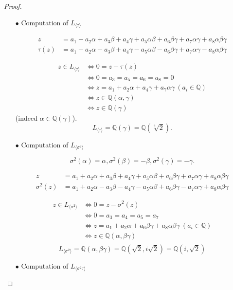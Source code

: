 \documentclass[11pt,a4paper]{article}
\newcommand{\Q}{\mathbb{Q}}
\begin{document}
\begin{proof}
\begin{enumerate}
\item[$\bullet$] Computation of $L_{\langle \tau\rangle}$

\begin{align*}
z &= a_1+a_2 \alpha + a_3 \beta + a_4 \gamma + a_5 \alpha \beta + a_6 \beta \gamma + a_7 \alpha \gamma + a_8 \alpha \beta \gamma\\
\tau(z) &= a_1 + a_2\alpha-a_3 \beta+a_4 \gamma-a_5 \alpha \beta -a_6 \beta \gamma +a_7 \alpha \gamma - a_8 \alpha \beta \gamma
\end{align*}

\begin{align*}
z \in L_{\langle \tau \rangle} & \iff 0 = z -\tau(z)\\
&\iff 0 = a_3=a_5=a_6=a_8=0\\
&\iff z = a_1+a_2 \alpha + a_4 \gamma + a_7 \alpha \gamma \ (a_i \in \Q)\\
&\iff z \in \Q(\alpha,\gamma)\\
&\iff z \in \Q(\gamma)
\end{align*}
(indeed $\alpha \in \Q(\gamma)$).
$$L_{\langle \tau \rangle}=  \Q(\gamma) = \Q(\sqrt[4]{2}).$$


\item[$\bullet$] Computation of $L_{\langle\sigma^2\rangle}$

$$\sigma^2(\alpha) = \alpha, \sigma^2(\beta) = -\beta, \sigma^2(\gamma) = -\gamma.$$

\begin{align*}
z &= a_1+a_2 \alpha + a_3 \beta + a_4 \gamma + a_5 \alpha \beta + a_6 \beta \gamma + a_7 \alpha \gamma + a_8 \alpha \beta \gamma\\
\sigma^2(z) &= a_1+a_2\alpha -a_3 \beta -a_4 \gamma -a_5 \alpha \beta + a_6 \beta \gamma -a_7 \alpha \gamma +a_8 \alpha \beta \gamma
\end{align*}

\begin{align*}
z \in L_{\langle \sigma^2 \rangle} & \iff 0 = z -\sigma^2(z)\\
&\iff 0 = a_3=a_4=a_5=a_7\\
&\iff z = a_1+a_2 \alpha + a_6 \beta \gamma + a_8 \alpha  \beta \gamma \ (a_i \in \Q)\\
&\iff z \in \Q(\alpha,\beta \gamma)\\
\end{align*}
$$L_{\langle \sigma^2 \rangle} = \Q(\alpha,\beta \gamma) =\Q(\sqrt{2},i\sqrt{2}) = \Q(i,\sqrt{2})$$


\item[$\bullet$] Computation of $L_{\langle  \sigma^2 \tau \rangle}$


\end{enumerate}
\end{proof}
\end{document}
